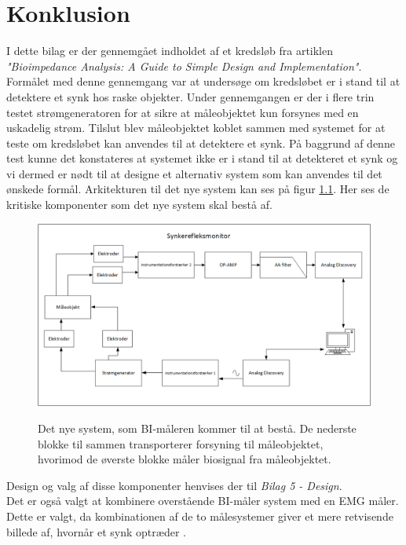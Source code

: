  



\chapter{Konklusion}

I dette bilag er der gennemgået indholdet af et kredsløb fra artiklen \textit{"Bioimpedance Analysis: A Guide to Simple Design and Implementation"}. Formålet med denne gennemgang var at undersøge om kredsløbet er i stand til at detektere et synk hos raske objekter. Under gennemgangen er der i flere trin testet strømgeneratoren for at sikre at måleobjektet kun forsynes med en uskadelig strøm. Tilslut blev måleobjektet koblet sammen med systemet for at teste om kredsløbet kan anvendes til at detektere et synk. På baggrund af denne test kunne det konstateres at systemet ikke er i stand til at detekteret et synk og vi dermed er nødt til at designe et alternativ system som kan anvendes til det ønskede formål. Arkitekturen til det nye system kan ses på figur \ref{fig:konklusiondiagram}. Her ses de kritiske komponenter som det nye system skal bestå af.

\begin{figure}[H]
\centering
{\includegraphics[width=\linewidth]
{Figure/konklusiondiagram}}
\caption{Det nye system, som BI-måleren kommer til at bestå. De nederste blokke til sammen transporterer forsyning til måleobjektet, hvorimod de øverste blokke måler biosignal fra måleobjektet. }
\label{fig:konklusiondiagram}
\end{figure}

Design og valg af disse komponenter henvises der til \textit{Bilag 5 - Design}. \\
Det er også valgt at kombinere overstående BI-måler system med en EMG måler. Dette er valgt, da kombinationen af de to målesystemer giver et mere retvisende billede af, hvornår et synk optræder \cite{Schultheiss2014}    \citep{ChristensenElisabeth;LundbakStrand2017}. 


